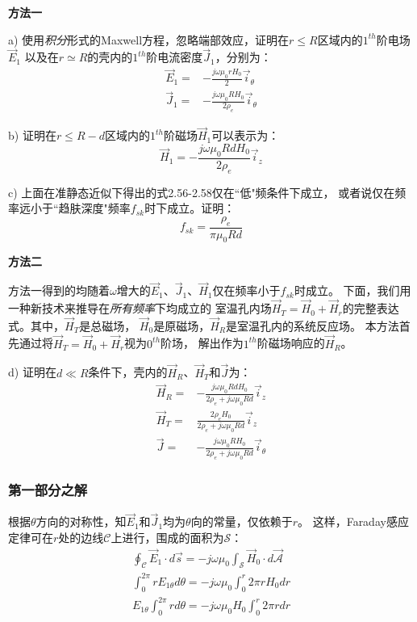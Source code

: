 \textbf{方法一}

a) 使用\textit{积分}形式的Maxwell方程，忽略端部效应，证明在$r\le R$区域内的$1^{th}$阶电场$\vec{E}_1$
以及在$r\simeq R$的壳内的$1^{th}$阶电流密度$\vec{J}_1$，分别为：
\begin{align}
\vec{E}_1=&-\frac{j\omega \mu_0 r H_0}{2} \vec{i}_\theta\\
\vec{J}_1=&-\frac{j\omega \mu_0 R H_0}{2\rho_e} \vec{i}_\theta
\end{align}

b) 证明在$r\le R-d$区域内的$1^{th}$阶磁场$\vec{H}_1$可以表示为：
\begin{equation}
\vec{H}_1=-\frac{j\omega \mu_0 R d H_0}{2\rho_e}\vec{i}_z
\end{equation} 

c) 上面在准静态近似下得出的式2.56-2.58仅在``低"频条件下成立，
或者说仅在频率远小于``趋肤深度"频率$f_{sk}$时下成立。证明：
\begin{equation}
f_{sk}=\frac{\rho_e}{\pi \mu_0 R d}
\end{equation}

\textbf{方法二}

方法一得到的均随着$\omega$增大的$\vec{E}_1$、$\vec{J}_1$、$\vec{H}_1$仅在频率小于$f_{sk}$时成立。
下面，我们用一种新技术来推导在\textit{所有频率}下均成立的
室温孔内场$\vec{H}_T=\vec{H}_0+\vec{H}_r$的完整表达式。其中，$\vec{H}_T$是总磁场，
$\vec{H}_0$是原磁场，$\vec{H}_R$是室温孔内的系统反应场。
本方法首先通过将$\vec{H}_T=\vec{H}_0+\vec{H}_r$视为$0^{th}$阶场，
解出作为$1^{th}$阶磁场响应的$\vec{H}_R$。

d) 证明在$d\ll R$条件下，壳内的$\vec{H}_R$、$\vec{H}_T$和$\vec{J}$为：
\begin{align}
\vec{H}_R=&-\frac{j\omega \mu_0 R d H_0}{2\rho_e+j\omega \mu_0 R d} \vec{i}_z\\
\vec{H}_T=&\frac{2\rho_e H_0}{2\rho_e+j\omega \mu_0 R d} \vec{i}_z\\
\vec{J}=&-\frac{j\omega \mu_0 R H_0}{2\rho_e+j\omega \mu_0 R d} \vec{i}_\theta
\end{align}

\subsubsection*{第一部分之解}
根据$\theta$方向的对称性，知$\vec{E}_1$和$\vec{J}_1$均为$\theta$向的常量，仅依赖于$r$。
这样，Faraday感应定律可在$r$处的边线$\mathcal{C}$上进行，围成的面积为$\mathcal{S}$：
\begin{align}
\oint_{\mathcal{C}} \vec{E}_1 \cdot d\vec{s}=-j\omega \mu_0 \int_{\mathcal{S}} \vec{H}_0 \cdot d\vec{\mathcal{A}}\nonumber\\
\int_{0}^{2\pi} r E_{1\theta} d\theta=-j\omega \mu_0 \int_{0}^{r} 2\pi r H_0 dr\nonumber\\
E_{1\theta}\int_{0}^{2\pi} r d\theta=-j\omega \mu_0 H_0\int_{0}^{r} 2\pi r dr\nonumber\tag{S7.1}
\end{align}

